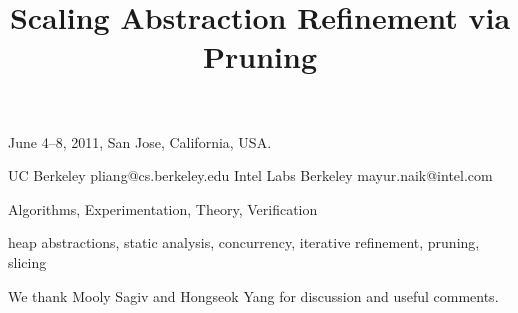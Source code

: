\documentclass[nocopyrightspace,9pt]{sigplanconf}
\begin{document}
 {June 4--8, 2011, San Jose, California, USA.}


\title{Scaling Abstraction Refinement via Pruning}

           {UC  Berkeley}
           {pliang@cs.berkeley.edu}
           {Intel Labs Berkeley}
           {mayur.naik@intel.com}




\maketitle


\terms
Algorithms, Experimentation, Theory, Verification

\keywords
heap abstractions, static analysis, concurrency, iterative refinement, pruning, slicing











\acks
We thank Mooly Sagiv and Hongseok Yang for discussion and useful comments.





\end{document}
